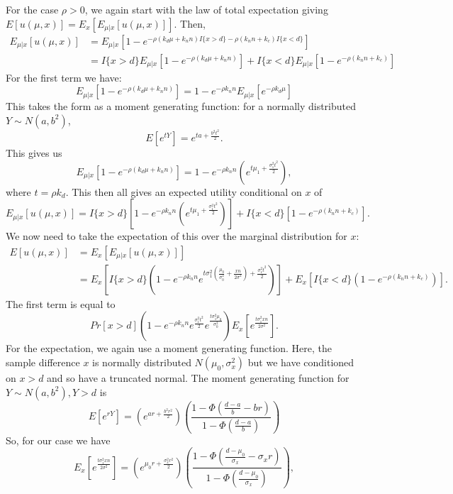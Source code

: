 \documentclass[sagev, Crown]{sagej} %
\begin{document}
For the case $\rho > 0$, we again start with the law of total expectation giving $E[u(\mu, x)] = E_x\left[ E_{\mu | x} [u(\mu, x)] \right]$. Then,
\begin{align*}
E_{\mu | x} [u(\mu, x)] &= E_{\mu | x}[1 - e^{-\rho(k_d\mu + k_n n) I\{x > d\} -\rho(k_n n + k_c) I\{x < d\}}] \\
&= I\{x > d\} E_{\mu | x}[1 - e^{-\rho(k_d\mu + k_n n)}] + I\{x < d\}E_{\mu | x}[1 - e^{-\rho(k_n n + k_c)}]
\end{align*}
For the first term we have:
$$
E_{\mu | x}[1 - e^{-\rho(k_d\mu + k_n n)}] = 1 - e^{-\rho k_n n} E_{\mu | x}[e^{-\rho k_d \mu}]
$$
This takes the form as a moment generating function: for a normally distributed $Y \sim N(a, b^2)$,
$$
E[e^{tY}] = e^{ta + \frac{b^2 t^2}{2}}.
$$
This gives us
$$
E_{\mu | x}[1 - e^{-\rho(k_d\mu + k_n n)}] = 1 - e^{-\rho k_n n} \left(e^{t\mu_1 + \frac{\sigma_1^2 t^2}{2}} \right),
$$
where $t = \rho k_d$. This then all gives an expected utility conditional on $x$ of
$$
E_{\mu | x} [u(\mu, x)] = I\{x > d\} \left[1 - e^{-\rho k_n n} \left(e^{t\mu_1 + \frac{\sigma_1^2 t^2}{2}} \right) \right] + I\{x < d\}\left[1 - e^{-\rho(k_n n + k_c)}\right].
$$
We now need to take the expectation of this over the marginal distribution for $x$:
$$
\begin{aligned}
E[u(\mu, x)] &= E_x\left[ E_{\mu | x} [u(\mu, x)] \right] \\
 &= E_x\left[ I\{x > d\} \left(1 - e^{-\rho k_n n} e^{t\sigma_1^2(\frac{\mu_0}{\sigma_0^2} + \frac{xn}{2\sigma^2}) + \frac{\sigma_1^2 t^2}{2}} \right) \right] + 
 E_x\left[ I\{x < d\}\left(1 - e^{-\rho(k_n n + k_c)}\right) \right].
\end{aligned}
$$
The first term is equal to
$$
Pr[x > d] \left( 1 - e^{-\rho k_n n} e^{\frac{\sigma_1^2 t^2}{2}} e^{\frac{t\sigma_1^2 \mu_0}{\sigma_0^2}}   \right) E_x \left[ e^{\frac{t\sigma_1^2 x n}{2\sigma^2}} \right].
$$
For the expectation, we again use a moment generating function. Here, the sample difference $x$ is normally distributed $N(\mu_0, \sigma_x^2)$ but we have conditioned on $x > d$ and so have a truncated normal. The moment generating function for $Y \sim N(a,b^2), Y > d$ is
$$
E[e^{rY}] =  \left( e^{ar + \frac{b^2 r^2}{2} } \right) \left(\frac{1 - \Phi(\frac{d-a}{b} - br)}{1 - \Phi(\frac{d-a}{b} )} \right)
$$
So, for our case we have
$$
 E_x \left[ e^{\frac{t\sigma_1^2 x n}{2\sigma^2}} \right] = \left( e^{\mu_0 r + \frac{\sigma_x^2 r^2}{2} } \right) \left(\frac{1 - \Phi(\frac{d-\mu_0}{\sigma_x} - \sigma_x r)}{1 - \Phi(\frac{d-\mu_0}{\sigma_x})} \right),
$$
\end{document}
